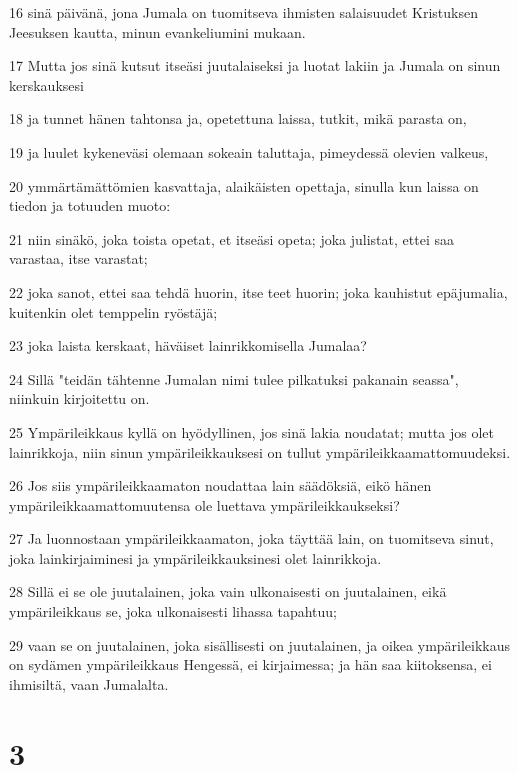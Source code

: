 \par 16 sinä päivänä, jona Jumala on tuomitseva ihmisten salaisuudet Kristuksen Jeesuksen kautta, minun evankeliumini mukaan.
\par 17 Mutta jos sinä kutsut itseäsi juutalaiseksi ja luotat lakiin ja Jumala on sinun kerskauksesi
\par 18 ja tunnet hänen tahtonsa ja, opetettuna laissa, tutkit, mikä parasta on,
\par 19 ja luulet kykeneväsi olemaan sokeain taluttaja, pimeydessä olevien valkeus,
\par 20 ymmärtämättömien kasvattaja, alaikäisten opettaja, sinulla kun laissa on tiedon ja totuuden muoto:
\par 21 niin sinäkö, joka toista opetat, et itseäsi opeta; joka julistat, ettei saa varastaa, itse varastat;
\par 22 joka sanot, ettei saa tehdä huorin, itse teet huorin; joka kauhistut epäjumalia, kuitenkin olet temppelin ryöstäjä;
\par 23 joka laista kerskaat, häväiset lainrikkomisella Jumalaa?
\par 24 Sillä "teidän tähtenne Jumalan nimi tulee pilkatuksi pakanain seassa", niinkuin kirjoitettu on.
\par 25 Ympärileikkaus kyllä on hyödyllinen, jos sinä lakia noudatat; mutta jos olet lainrikkoja, niin sinun ympärileikkauksesi on tullut ympärileikkaamattomuudeksi.
\par 26 Jos siis ympärileikkaamaton noudattaa lain säädöksiä, eikö hänen ympärileikkaamattomuutensa ole luettava ympärileikkaukseksi?
\par 27 Ja luonnostaan ympärileikkaamaton, joka täyttää lain, on tuomitseva sinut, joka lainkirjaiminesi ja ympärileikkauksinesi olet lainrikkoja.
\par 28 Sillä ei se ole juutalainen, joka vain ulkonaisesti on juutalainen, eikä ympärileikkaus se, joka ulkonaisesti lihassa tapahtuu;
\par 29 vaan se on juutalainen, joka sisällisesti on juutalainen, ja oikea ympärileikkaus on sydämen ympärileikkaus Hengessä, ei kirjaimessa; ja hän saa kiitoksensa, ei ihmisiltä, vaan Jumalalta.

\chapter{3}

